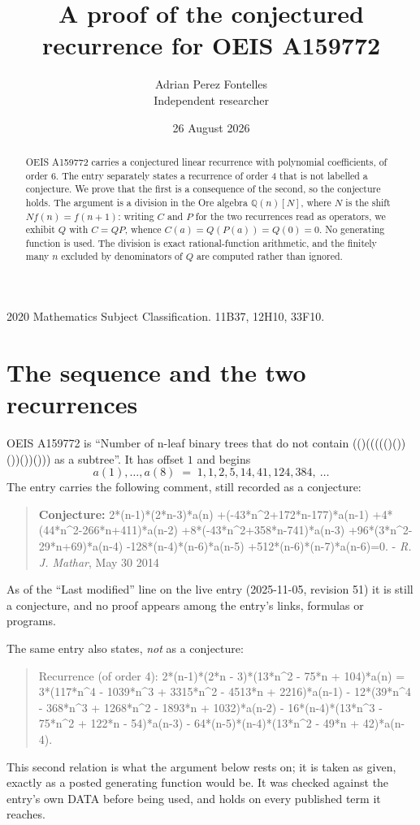 \documentclass[11pt,a4paper]{article}
\title{A proof of the conjectured recurrence for OEIS A159772}
\author{Adrian Perez Fontelles\\ \small Independent researcher}
\date{26 August 2026}
\theoremstyle{plain}
\theoremstyle{definition}
\begin{document}
\maketitle

\begin{abstract}
OEIS A159772 carries a conjectured linear recurrence with polynomial coefficients, of
order 6. The entry separately states a recurrence of order 4 that is not
labelled a conjecture. We prove that the first is a consequence of the second, so the
conjecture holds. The argument is a division in the Ore algebra
$\mathbb{Q}(n)[N]$, where $N$ is the shift $Nf(n)=f(n+1)$: writing $C$ and $P$ for the two
recurrences read as operators, we exhibit $Q$ with $C=QP$, whence
$C(a)=Q(P(a))=Q(0)=0$. No generating function is used. The division is exact
rational-function arithmetic, and the finitely many $n$ excluded by denominators of $Q$
are computed rather than ignored.
\end{abstract}

\noindent\small 2020 Mathematics Subject Classification. 11B37, 12H10, 33F10.\normalsize

\section{The sequence and the two recurrences}

OEIS A159772 is ``Number of n-leaf binary trees that do not contain (()((((()())())())())) as a subtree''. It has offset $1$ and begins
\[
a(1),\dots,a(8)\;=\;1, 1, 2, 5, 14, 41, 124, 384,\ \dots
\]
The entry carries the following comment, still recorded as a conjecture:
\begin{quote}\small
\textbf{Conjecture:} 2*(n-1)*(2*n-3)*a(n) +(-43*n\^{}2+172*n-177)*a(n-1) +4*(44*n\^{}2-266*n+411)*a(n-2) +8*(-43*n\^{}2+358*n-741)*a(n-3) +96*(3*n\^{}2-29*n+69)*a(n-4) -128*(n-4)*(n-6)*a(n-5) +512*(n-6)*(n-7)*a(n-6)=0. - \emph{R. J. Mathar}, May 30 2014
\end{quote}
As of the ``Last modified'' line on the live entry (2025-11-05, revision 51) it is still
a conjecture, and no proof appears among the entry's links, formulas or programs.

The same entry also states, \emph{not} as a conjecture:
\begin{quote}\small
Recurrence (of order 4): 2*(n-1)*(2*n - 3)*(13*n\^{}2 - 75*n + 104)*a(n) = 3*(117*n\^{}4 - 1039*n\^{}3 + 3315*n\^{}2 - 4513*n + 2216)*a(n-1) - 12*(39*n\^{}4 - 368*n\^{}3 + 1268*n\^{}2 - 1893*n + 1032)*a(n-2) - 16*(n-4)*(13*n\^{}3 - 75*n\^{}2 + 122*n - 54)*a(n-3) - 64*(n-5)*(n-4)*(13*n\^{}2 - 49*n + 42)*a(n-4).
\end{quote}
This second relation is what the argument below rests on; it is taken as given, exactly as
a posted generating function would be. It was checked against the entry's own DATA before
being used, and holds on every published term it reaches.
\end{document}
